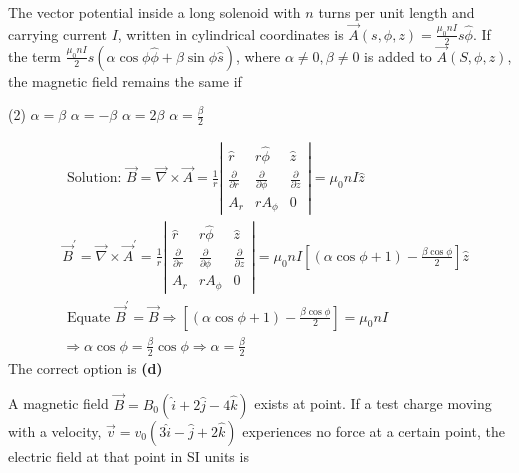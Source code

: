 \begin{enumerate}
\begin{answer}
	\end{answer}
	\begin{minipage}{\textwidth}
		\item The vector potential inside a long solenoid with $n$ turns per unit length and carrying current $I$, written in cylindrical coordinates is $\vec{A}(s, \phi, z)=\frac{\mu_{0} n I}{2} s \hat{\phi}$. If the term $\frac{\mu_{0} n I}{2} s(\alpha \cos \phi \hat{\phi}+\beta \sin \phi \hat{s})$, where $\alpha \neq 0, \beta \neq 0$ is added to $\vec{A}(S, \phi, z)$, the magnetic field remains the same if
	\end{minipage}
	\begin{tasks}(2)
		\task[\textbf{A.}]$\alpha=\beta$
		\task[\textbf{B.}]$\alpha=-\beta$
		\task[\textbf{C.}]$\alpha=2 \beta$
		\task[\textbf{D.}]$\alpha=\frac{\beta}{2}$
	\end{tasks}
	\begin{answer}
		\begin{align*}
		&\text { Solution: } \vec{B}=\vec{\nabla} \times \vec{A}=\frac{1}{r}\left|\begin{array}{ccc}
		\hat{r} & r \hat{\phi} & \hat{z} \\
		\frac{\partial}{\partial r} & \frac{\partial}{\partial \phi} & \frac{\partial}{\partial z} \\
		A_{r} & r A_{\phi} & 0
		\end{array}\right|=\mu_{0} n I \hat{z} \\
		&\vec{B}^{\prime}=\vec{\nabla} \times \vec{A}^{\prime}=\frac{1}{r}\left|\begin{array}{ccc}
		\hat{r} & r \hat{\phi} & \hat{z} \\
		\frac{\partial}{\partial r} & \frac{\partial}{\partial \phi} & \frac{\partial}{\partial z} \\
		A_{r} & r A_{\phi} & 0
		\end{array}\right|=\mu_{0} n I\left[(\alpha \cos \phi+1)-\frac{\beta \cos \phi}{2}\right] \hat{z} \\
		&\text { Equate } \vec{B}^{\prime}=\vec{B} \Rightarrow\left[(\alpha \cos \phi+1)-\frac{\beta \cos \phi}{2}\right]=\mu_{0} n I \\
		&\Rightarrow \alpha \cos \phi=\frac{\beta}{2} \cos \phi \Rightarrow \alpha=\frac{\beta}{2}
		\end{align*}
		The correct option is \textbf{(d)}	
	\end{answer}
	\begin{minipage}{\textwidth}
		\item A magnetic field $\vec{B}=B_{0}(\hat{i}+2 \hat{j}-4 \hat{k})$ exists at point. If a test charge moving with a velocity, $\vec{v}=v_{0}(3 \hat{i}-\hat{j}+2 \hat{k})$ experiences no force at a certain point, the electric field at that point in SI units is

\end{minipage}
\end{enumerate}
